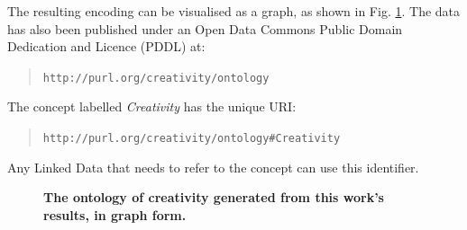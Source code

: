 \documentclass[10pt,letterpaper]{article}
\begin{document}
The resulting encoding can be visualised as a graph, as shown in Fig. \ref{ontologyGraph}. 
The data has also been published under an Open Data Commons Public Domain Dedication and Licence (PDDL) \cite{miller08} at:
\begin{quote}
\texttt{\scriptsize http://purl.org/creativity/ontology}
\end{quote}
The concept labelled {\em Creativity} has the unique URI: 
\begin{quote}
\texttt{\scriptsize http://purl.org/creativity/ontology\#Creativity}
\end{quote}%
Any Linked Data that needs to refer to the concept can use this identifier. 

\begin{figure}
\caption{{\bf The ontology of creativity generated from this work's results, in graph form.}}
\label{ontologyGraph}
\end{figure}






\end{document}
